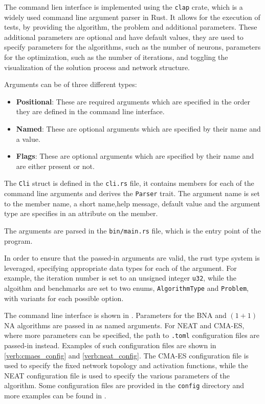 The command lien interface is implemented using the \texttt{clap} crate, which is a widely used command line argument parser in Rust.
It allows for the execution of tests, by providing the algorithm, the problem and additional parameters. These additional parameters are optional and have
default values, they are used to specify parameters for the algorithms, such as the number of neurons, parameters for the optimization, such as the number of
iterations, and toggling the visualization of the solution process and network structure.

Arguments can be of three different types:

\begin{itemize}
    \item \textbf{Positional}: These are required arguments which are specified in the order they are defined in the command line interface.
    \item \textbf{Named}: These are optional arguments which are specified by their name and a value.
    \item \textbf{Flags}: These are optional arguments which are specified by their name and are either present or not.
\end{itemize}

The \texttt{Cli} struct is defined in the \texttt{cli.rs} file, it contains members for each of the command line arguments and derives the \texttt{Parser} trait.
The argument name is set to the member name, a short name,help message, default value and the argument type are specifies in an attribute on the member.

The arguments are parsed in the \texttt{bin/main.rs} file, which is the entry point of the program.

In order to ensure that the passed-in arguments are valid, the rust type system is leveraged, specifying appropriate data types for each of the argument.
For example, the iteration number is set to an unsigned integer \texttt{u32}, while the algoithm and benchmarks are set to two enums, \texttt{AlgorithmType} and
\texttt{Problem}, with variants for each possible option.

The command line interface is shown in . Parameters for the BNA and $(1 + 1)$ NA algorithms are passed in as named arguments. For NEAT and CMA-ES, where more
parameters can be specified, the path to \texttt{.toml} configuration files are passed-in instead. Examples of such configuration files are shown in \ref{verb:cmaes_config}
and \ref{verb:neat_config}. The CMA-ES configuration file is used to specify the fixed network topology and activation functions, while the NEAT configuration file
is used to specify the various parameters of the algorithm. Some configuration files are provided in the \texttt{config} directory and more examples can be found in
.

